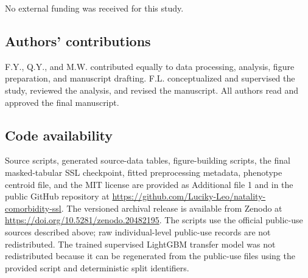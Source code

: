 \documentclass[pdflatex,sn-vancouver-num]{sn-jnl}
\begin{document}
No external funding was received for this study.

\subsection*{Authors' contributions}

F.Y., Q.Y., and M.W. contributed equally to data processing, analysis, figure preparation, and manuscript drafting. F.L. conceptualized and supervised the study, reviewed the analysis, and revised the manuscript. All authors read and approved the final manuscript.

\subsection*{Code availability}

Source scripts, generated source-data tables, figure-building scripts, the final masked-tabular SSL checkpoint, fitted preprocessing metadata, phenotype centroid file, and the MIT license are provided as Additional file 1 and in the public GitHub repository at \url{https://github.com/Luciky-Leo/natality-comorbidity-ssl}. The versioned archival release is available from Zenodo at \url{https://doi.org/10.5281/zenodo.20482195}. The scripts use the official public-use sources described above; raw individual-level public-use records are not redistributed. The trained supervised LightGBM transfer model was not redistributed because it can be regenerated from the public-use files using the provided script and deterministic split identifiers.


\end{document}
